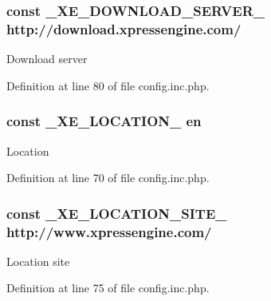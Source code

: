 \subsubsection[{\+\_\+\+X\+E\+\_\+\+D\+O\+W\+N\+L\+O\+A\+D\+\_\+\+S\+E\+R\+V\+E\+R\+\_\+}]{\setlength{\rightskip}{0pt plus 5cm}const \+\_\+\+X\+E\+\_\+\+D\+O\+W\+N\+L\+O\+A\+D\+\_\+\+S\+E\+R\+V\+E\+R\+\_\+ \textquotesingle{}http\+://download.\+xpressengine.\+com/\textquotesingle{}}\label{config_8inc_8php_a22df32d3e0eae0d60d6cddb9ec99d5ec}
Download server 

Definition at line 80 of file config.\+inc.\+php.

\hypertarget{config_8inc_8php_a7330debbfb3a027cdd5f3d3dd1dfbdd0}{}
\subsubsection[{\+\_\+\+X\+E\+\_\+\+L\+O\+C\+A\+T\+I\+O\+N\+\_\+}]{\setlength{\rightskip}{0pt plus 5cm}const \+\_\+\+X\+E\+\_\+\+L\+O\+C\+A\+T\+I\+O\+N\+\_\+ \textquotesingle{}en\textquotesingle{}}\label{config_8inc_8php_a7330debbfb3a027cdd5f3d3dd1dfbdd0}
Location 

Definition at line 70 of file config.\+inc.\+php.

\hypertarget{config_8inc_8php_a063bfd2eb9f811b1676d0dbc0cad2648}{}
\subsubsection[{\+\_\+\+X\+E\+\_\+\+L\+O\+C\+A\+T\+I\+O\+N\+\_\+\+S\+I\+T\+E\+\_\+}]{\setlength{\rightskip}{0pt plus 5cm}const \+\_\+\+X\+E\+\_\+\+L\+O\+C\+A\+T\+I\+O\+N\+\_\+\+S\+I\+T\+E\+\_\+ \textquotesingle{}http\+://www.\+xpressengine.\+com/\textquotesingle{}}\label{config_8inc_8php_a063bfd2eb9f811b1676d0dbc0cad2648}
Location site 

Definition at line 75 of file config.\+inc.\+php.

